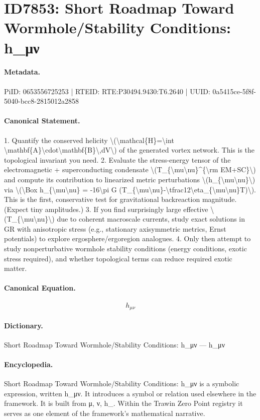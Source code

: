 \section*{ID7853: Short Roadmap Toward Wormhole/Stability Conditions: h\_μν}
\paragraph{Metadata.}
PiID: 0653556725253 | RTEID: RTE:P30494.9430:T6.2640 | UUID: 0a5415ce-5f8f-5040-bcc8-2815012a2858

\paragraph{Canonical Statement.}
1. Quantify the conserved helicity \textbackslash{}(\textbackslash{}mathcal\{H\}=\textbackslash{}int \textbackslash{}mathbf\{A\}\textbackslash{}cdot\textbackslash{}mathbf\{B\}\textbackslash{},dV\textbackslash{}) of the generated vortex network. This is the topological invariant you need. 2. Evaluate the stress-energy tensor of the electromagnetic + superconducting condensate \textbackslash{}(T\_\{\textbackslash{}mu\textbackslash{}nu\}\textasciicircum{}\{\textbackslash{}rm EM+SC\}\textbackslash{}) and compute its contribution to linearized metric perturbations \textbackslash{}(h\_\{\textbackslash{}mu\textbackslash{}nu\}\textbackslash{}) via \textbackslash{}(\textbackslash{}Box h\_\{\textbackslash{}mu\textbackslash{}nu\} = -16\textbackslash{}pi G (T\_\{\textbackslash{}mu\textbackslash{}nu\}-\textbackslash{}tfrac12\textbackslash{}eta\_\{\textbackslash{}mu\textbackslash{}nu\}T)\textbackslash{}). This is the first, conservative test for gravitational backreaction magnitude. (Expect tiny amplitudes.) 3. If you find surprisingly large effective \textbackslash{}(T\_\{\textbackslash{}mu\textbackslash{}nu\}\textbackslash{}) due to coherent macroscale currents, study exact solutions in GR with anisotropic stress (e.g., stationary axisymmetric metrics, Ernst potentials) to explore ergosphere/ergoregion analogues. 4. Only then attempt to study nonperturbative wormhole stability conditions (energy conditions, exotic stress required), and whether topological terms can reduce required exotic matter.

\paragraph{Canonical Equation.}
\[
h_{\mu\nu}
\]

\paragraph{Dictionary.}
Short Roadmap Toward Wormhole/Stability Conditions: h\_μν — h\_μν

\paragraph{Encyclopedia.}
Short Roadmap Toward Wormhole/Stability Conditions: h\_μν is a symbolic expression, written h\_μν. It introduces a symbol or relation used elsewhere in the framework. It is built from μ, ν, h\_. Within the Trawin Zero Point registry it serves as one element of the framework's mathematical narrative.
